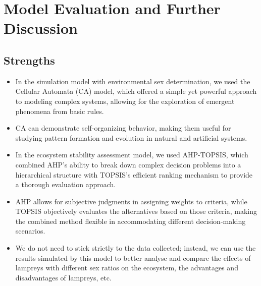 \documentclass{mcmthesis}
\begin{document}
\section{Model Evaluation and Further Discussion}
\subsection{Strengths}
\begin{itemize}
    \item In the simulation model with environmental sex determination, we used the Cellular Automata (CA) model, which offered a simple yet powerful approach to modeling complex systems, allowing for the exploration of emergent phenomena from basic rules. 
    \item  CA can demonstrate self-organizing behavior, making them useful for studying pattern formation and evolution in natural and artificial systems. 
    \item In the ecosystem stability assessment model, we used AHP-TOPSIS, which combined AHP's ability to break down complex decision problems into a hierarchical structure with TOPSIS's efficient ranking mechanism to provide a thorough evaluation approach.
    \item AHP allows for subjective judgments in assigning weights to criteria, while TOPSIS objectively evaluates the alternatives based on those criteria, making the combined method flexible in accommodating different decision-making scenarios.
    \item We do not need to stick strictly to the data collected; instead, we can use the results simulated by this model to better analyse and compare the effects of lampreys with different sex ratios on the ecosystem, the advantages and disadvantages of lampreys, etc.
\end{itemize}
\end{document}
